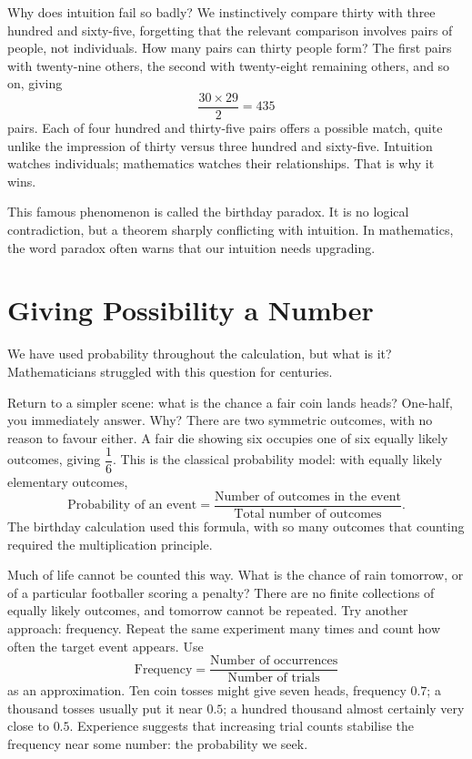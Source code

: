 Why does intuition fail so badly? We instinctively compare thirty with three hundred and sixty-five, forgetting that the relevant comparison involves pairs of people, not individuals. How many pairs can thirty people form? The first pairs with twenty-nine others, the second with twenty-eight remaining others, and so on, giving
\[
\frac{30\times 29}{2}=435
\]
pairs. Each of four hundred and thirty-five pairs offers a possible match, quite unlike the impression of thirty versus three hundred and sixty-five. Intuition watches individuals; mathematics watches their relationships. That is why it wins.

This famous phenomenon is called the birthday paradox. It is no logical contradiction, but a theorem sharply conflicting with intuition. In mathematics, the word paradox often warns that our intuition needs upgrading.

\section{Giving Possibility a Number}

We have used probability throughout the calculation, but what is it? Mathematicians struggled with this question for centuries.

Return to a simpler scene: what is the chance a fair coin lands heads? One-half, you immediately answer. Why? There are two symmetric outcomes, with no reason to favour either. A fair die showing six occupies one of six equally likely outcomes, giving $\dfrac{1}{6}$. This is the classical probability model: with equally likely elementary outcomes,
\[
\text{Probability of an event}=\frac{\text{Number of outcomes in the event}}{\text{Total number of outcomes}}.
\]
The birthday calculation used this formula, with so many outcomes that counting required the multiplication principle.

Much of life cannot be counted this way. What is the chance of rain tomorrow, or of a particular footballer scoring a penalty? There are no finite collections of equally likely outcomes, and tomorrow cannot be repeated. Try another approach: frequency. Repeat the same experiment many times and count how often the target event appears. Use
\[
\text{Frequency}=\frac{\text{Number of occurrences}}{\text{Number of trials}}
\]
as an approximation. Ten coin tosses might give seven heads, frequency $0.7$; a thousand tosses usually put it near $0.5$; a hundred thousand almost certainly very close to $0.5$. Experience suggests that increasing trial counts stabilise the frequency near some number: the probability we seek.

